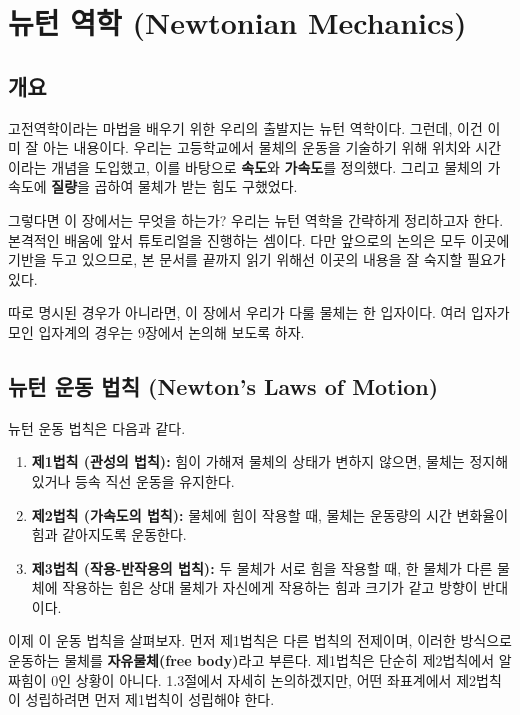 \documentclass[chapter, oneside, b5paper]{oblivoir}
\theoremstyle{plain}
\theoremstyle{definition}
\theoremstyle{remark}
\begin{document}
\chapter{뉴턴 역학 (Newtonian Mechanics)}

\section{개요}
고전역학이라는 마법을 배우기 위한 우리의 출발지는 뉴턴 역학이다. 그런데, 이건 이미 잘 아는 내용이다. 우리는 고등학교에서 물체의 운동을 기술하기 위해 위치와 시간이라는 개념을 도입했고, 이를 바탕으로 \textbf{속도}와 \textbf{가속도}를 정의했다. 그리고 물체의 가속도에 \textbf{질량}을 곱하여 물체가 받는 힘도 구했었다.

그렇다면 이 장에서는 무엇을 하는가? 우리는 뉴턴 역학을 간략하게 정리하고자 한다. 본격적인 배움에 앞서 튜토리얼을 진행하는 셈이다. 다만 앞으로의 논의은 모두 이곳에 기반을 두고 있으므로, 본 문서를 끝까지 읽기 위해선 이곳의 내용을 잘 숙지할 필요가 있다.

따로 명시된 경우가 아니라면, 이 장에서 우리가 다룰 물체는 한 입자이다. 여러 입자가 모인 입자계의 경우는 9장에서 논의해 보도록 하자.

\section{뉴턴 운동 법칙 (Newton's Laws of Motion)}
뉴턴 운동 법칙은 다음과 같다.

\begin{enumerate}
    \item \textbf{제1법칙 (관성의 법칙):} 힘이 가해져 물체의 상태가 변하지 않으면, 물체는 정지해 있거나 등속 직선 운동을 유지한다.
    \item \textbf{제2법칙 (가속도의 법칙):} 물체에 힘이 작용할 때, 물체는 운동량의 시간 변화율이 힘과 같아지도록 운동한다.
    \item \textbf{제3법칙 (작용-반작용의 법칙):} 두 물체가 서로 힘을 작용할 때, 한 물체가 다른 물체에 작용하는 힘은 상대 물체가 자신에게 작용하는 힘과 크기가 같고 방향이 반대이다.
\end{enumerate}

이제 이 운동 법칙을 살펴보자. 먼저 제1법칙은 다른 법칙의 전제이며, 이러한 방식으로 운동하는 물체를 \textbf{자유물체(free body)}라고 부른다. 제1법칙은 단순히 제2법칙에서 알짜힘이 0인 상황이 아니다. 1.3절에서 자세히 논의하겠지만, 어떤 좌표계에서 제2법칙이 성립하려면 먼저 제1법칙이 성립해야 한다.
\end{document}
